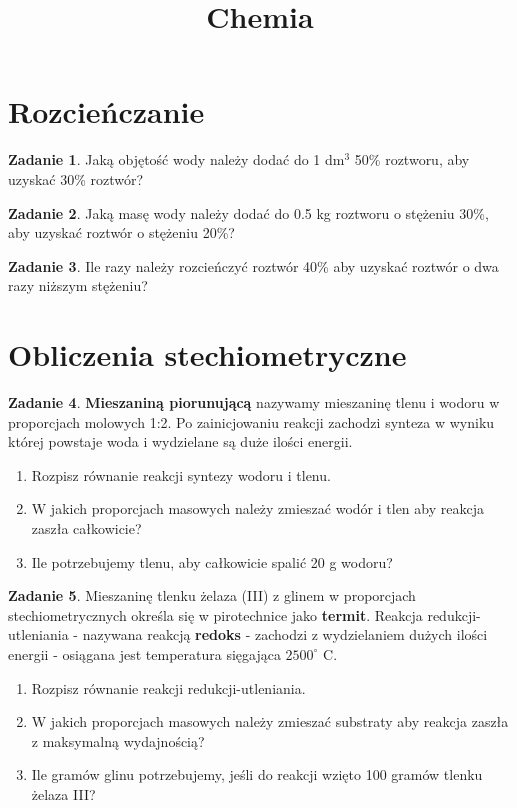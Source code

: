 \documentclass[11pt]{article}
\title{Chemia}
\theoremstyle{definition}
\newtheorem{zad}{Zadanie}
\numberwithin{zad}{section}
\begin{document}
\maketitle

\section{Rozcieńczanie}

\begin{zad}
Jaką objętość wody należy dodać do 1 dm$^3$ 50\% roztworu, aby uzyskać 30\% roztwór?
\end{zad}


\begin{zad}
Jaką masę wody należy dodać do 0.5 kg roztworu o stężeniu 30\%, aby uzyskać roztwór o stężeniu 20\%?
\end{zad}

\begin{zad}
Ile razy należy rozcieńczyć roztwór 40\% aby uzyskać roztwór o dwa razy niższym stężeniu?
\end{zad}

\section{Obliczenia stechiometryczne}

\begin{zad}
\textbf{Mieszaniną piorunującą} nazywamy mieszaninę tlenu i wodoru w proporcjach molowych 1:2. Po zainicjowaniu reakcji zachodzi synteza w wyniku której powstaje woda i wydzielane są duże ilości energii.

\begin{enumerate}
\item Rozpisz równanie reakcji syntezy wodoru i tlenu.
\item W jakich proporcjach masowych należy zmieszać wodór i tlen aby reakcja zaszła całkowicie?
\item Ile potrzebujemy tlenu, aby całkowicie spalić 20 g wodoru?
\end{enumerate}
\end{zad}

\begin{zad}
Mieszaninę tlenku żelaza (III) z glinem w proporcjach stechiometrycznych określa się w pirotechnice jako \textbf{termit}. Reakcja redukcji-utleniania - nazywana reakcją \textbf{redoks} - zachodzi z wydzielaniem dużych ilości energii - osiągana jest temperatura sięgająca $2500^\circ$ C.

\begin{enumerate}
\item Rozpisz równanie reakcji redukcji-utleniania.
\item W jakich proporcjach masowych należy zmieszać substraty aby reakcja zaszła z maksymalną wydajnością?
\item Ile gramów glinu potrzebujemy, jeśli do reakcji wzięto 100 gramów tlenku żelaza III?
\end{enumerate}
\end{zad}
\end{document}
